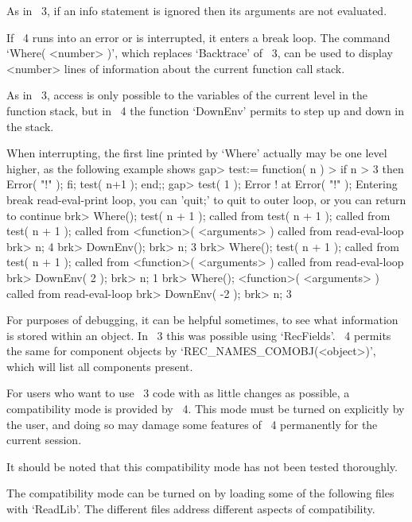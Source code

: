 As in {\GAP}~3, if an info statement is ignored then its arguments are
not evaluated.



If {\GAP}~4 runs into an error or is interrupted,
it enters a break loop.
The command `Where( <number> )', which replaces `Backtrace' of {\GAP}~3,
can be used to display <number> lines of information about the current
function call stack.

As in {\GAP}~3, access is only possible to the variables of the current
level in the function stack,
but in {\GAP}~4 the function `DownEnv' permits to step up and down in the
stack.

When interrupting, the first line printed by `Where' actually may be
one level higher, as the following example shows
\begintt
gap> test:= function( n )
>    if n > 3 then Error( "!" ); fi; test( n+1 ); end;;
gap> test( 1 );
Error ! at
Error( "!" );
Entering break read-eval-print loop,
you can 'quit;' to quit to outer loop,
or you can return to continue
brk> Where();
test( n + 1 ); called from
test( n + 1 ); called from
test( n + 1 ); called from
<function>( <arguments> ) called from read-eval-loop
brk> n;
4
brk> DownEnv();
brk> n;
3
brk> Where();
test( n + 1 ); called from
test( n + 1 ); called from
<function>( <arguments> ) called from read-eval-loop
brk> DownEnv( 2 );
brk> n;
1
brk> Where();
<function>( <arguments> ) called from read-eval-loop
brk> DownEnv( -2 );
brk> n;
3
\endtt

For purposes of debugging, it can be helpful sometimes, to see what
information is stored within an object. In {\GAP}~3 this was possible using
`RecFields'. {\GAP}~4 permits the same for component objects by
`REC_NAMES_COMOBJ(<object>)', which will list all components present.



For users who want to use {\GAP}~3 code with as little changes as
possible, a compatibility mode is provided by {\GAP}~4.
This mode must be turned on explicitly by the user,
and doing so may damage some features of {\GAP}~4 permanently
for the current session.

It should be noted that this compatibility mode has not been tested
thoroughly.

The compatibility mode can be turned on by loading some of the following
files with `ReadLib'.
The different files address different aspects of compatibility.

